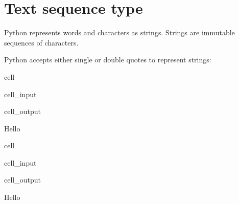 \documentclass[letterpaper,10pt,english]{jupyterBook}
\begin{document}
\section{Text sequence type}
\label{\detokenize{datatypes:text-sequence-type}}
\sphinxAtStartPar
Python represents words and characters as strings.
Strings are immutable sequences of characters.

\sphinxAtStartPar
Python accepts either single or double quotes to represent strings:

\begin{sphinxuseclass}{cell}\begin{sphinxVerbatimInput}

\begin{sphinxuseclass}{cell_input}
\begin{sphinxVerbatim}[commandchars=\\\{\}]
\end{sphinxVerbatim}

\end{sphinxuseclass}\end{sphinxVerbatimInput}
\begin{sphinxVerbatimOutput}

\begin{sphinxuseclass}{cell_output}
\begin{sphinxVerbatim}[commandchars=\\\{\}]
\PYGZsq{}Hello\PYGZsq{}
\end{sphinxVerbatim}

\end{sphinxuseclass}\end{sphinxVerbatimOutput}

\end{sphinxuseclass}
\begin{sphinxuseclass}{cell}\begin{sphinxVerbatimInput}

\begin{sphinxuseclass}{cell_input}
\begin{sphinxVerbatim}[commandchars=\\\{\}]
\end{sphinxVerbatim}

\end{sphinxuseclass}\end{sphinxVerbatimInput}
\begin{sphinxVerbatimOutput}

\begin{sphinxuseclass}{cell_output}
\begin{sphinxVerbatim}[commandchars=\\\{\}]
\PYGZsq{}Hello\PYGZsq{}
\end{sphinxVerbatim}

\end{sphinxuseclass}\end{sphinxVerbatimOutput}

\end{sphinxuseclass}
\end{document}
